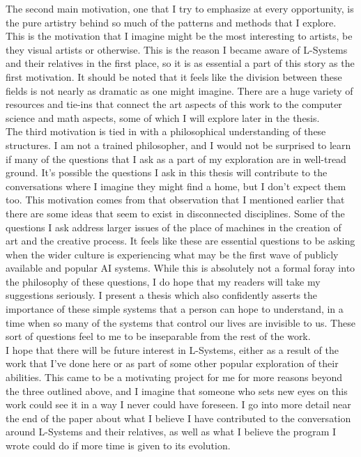 \documentclass[12pt,twoside]{reedthesis}
\begin{document}
	The second main motivation, one that I try to emphasize at every opportunity, is the pure artistry behind so much of the patterns and methods that I explore. This is the motivation that I imagine might be the most interesting to artists, be they visual artists or otherwise. This is the reason I became aware of L-Systems and their relatives in the first place, so it is as essential a part of this story as the first motivation. It should be noted that it feels like the division between these fields is not nearly as dramatic as one might imagine. There are a huge variety of resources and tie-ins that connect the art aspects of this work to the computer science and math aspects, some of which I will explore later in the thesis. \\
	
	The third motivation is tied in with a philosophical understanding of these structures. I am not a trained philosopher, and I would not be surprised to learn if many of the questions that I ask as a part of my exploration are in well-tread ground. It’s possible the questions I ask in this thesis will contribute to the conversations where I imagine they might find a home, but I don't expect them too. This motivation comes from that observation that I mentioned earlier that there are some ideas that seem to exist in disconnected disciplines. Some of the questions I ask address larger issues of the place of machines in the creation of art and the creative process. It feels like these are essential questions to be asking when the wider culture is experiencing what may be the first wave of publicly available and popular AI systems. While this is absolutely not a formal foray into the philosophy of these questions, I do hope that my readers will take my suggestions seriously. I present a thesis which also confidently asserts the importance of these simple systems that a person can hope to understand, in a time when so many of the systems that control our lives are invisible to us. These sort of questions feel to me to be inseparable from the rest of the work.\\
	
	I hope that there will be future interest in L-Systems, either as a result of the work that I’ve done here or as part of some other popular exploration of their abilities. This came to be a motivating project for me for more reasons beyond the three outlined above, and I imagine that someone who sets new eyes on this work could see it in a way I never could have foreseen. I go into more detail near the end of the paper about what I believe I have contributed to the conversation around L-Systems and their relatives, as well as what I believe the program I wrote could do if more time is given to its evolution.\\
	
\end{document}
